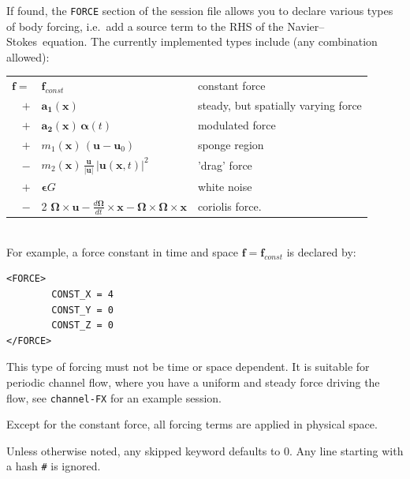 \documentclass[11pt,a4paper]{report}
\newcommand{\ie}{i.e.\ }
\newcommand\NavSto{Navier--Stokes}
\begin{document}
If found, the \verb+FORCE+ section of the session file allows you to
declare various types of body forcing, \ie add a source term
to the RHS of the \NavSto\ equation. The currently implemented types
include (any combination allowed):\\[1em]
\begin{tabular}{rll}
 $ \bm{f} =$ & $\bm{f}_{const}$                           &  constant force \\
           $+$ & $\bm{a_1}(\bm{x})$                       &
steady, but spatially varying force\\
           $+$ & $\bm{a_2}(\bm{x}) \, \bm{\alpha}(t) $ &  modulated
force\\
           $+$ & $m_1(\bm{x}) \, (\bm{u} - \bm{u}_0)$  &  sponge region
\\
           $-$ & $m_2(\bm{x}) \, \frac{\bm{u}}{|\bm{u}|} \,
|\bm{u}(\bm{x}, t)|^2$  &  'drag' force  \\
           $+$ & $\bm{\epsilon} G$                        &  white noise    \\
           $-$ & 2 $\bm{\Omega} \times \bm{u} - \frac{d\bm{\Omega}}{dt} \times \bm{x} -\bm{\Omega} \times \bm{\Omega} \times \bm{x}$  &  coriolis force. \\
\end{tabular}\\[1em]

\noindent For example, a force constant in time and space $\bm{f} =
\bm{f}_{const}$ is declared by:
\begin{verbatim}
<FORCE>
        CONST_X = 4
        CONST_Y = 0
        CONST_Z = 0
</FORCE>
\end{verbatim}
This type of forcing must not be time or space dependent. It is suitable
for periodic channel flow, where you have a uniform and steady force
driving the flow, see \verb+channel-FX+ for an example session.

Except for the constant force, all forcing terms are applied in
physical space.

Unless otherwise noted, any skipped keyword defaults to 0. Any line
starting with a hash \verb+#+ is ignored.
\end{document}
